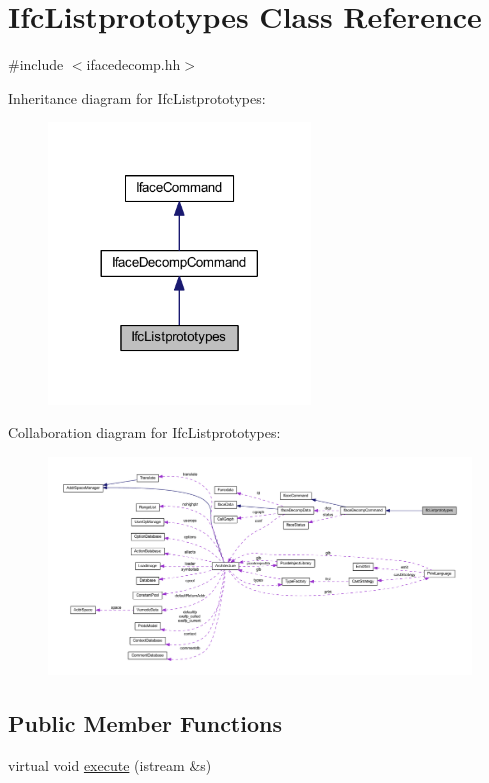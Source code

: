 \hypertarget{class_ifc_listprototypes}{}\section{Ifc\+Listprototypes Class Reference}
\label{class_ifc_listprototypes}


{\ttfamily \#include $<$ifacedecomp.\+hh$>$}



Inheritance diagram for Ifc\+Listprototypes\+:
\nopagebreak
\begin{figure}[H]
\begin{center}
\leavevmode
\includegraphics[width=197pt]{class_ifc_listprototypes__inherit__graph}
\end{center}
\end{figure}


Collaboration diagram for Ifc\+Listprototypes\+:
\nopagebreak
\begin{figure}[H]
\begin{center}
\leavevmode
\includegraphics[width=350pt]{class_ifc_listprototypes__coll__graph}
\end{center}
\end{figure}
\subsection*{Public Member Functions}
\begin{DoxyCompactItemize}
\item 
virtual void \mbox{\hyperlink{class_ifc_listprototypes_a6ec2d710e21d1c84a8d2b0ed8769f594}{execute}} (istream \&s)
\end{DoxyCompactItemize}
